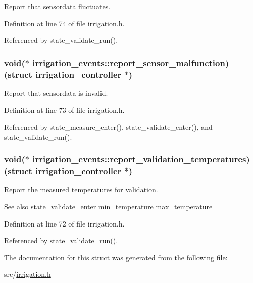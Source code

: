 Report that sensordata fluctuates. 



Definition at line 74 of file irrigation.\+h.



Referenced by state\+\_\+validate\+\_\+run().

\hypertarget{structirrigation__events_abafd6872889e6e54648653f690e61ec6}{}
\subsubsection[{report\+\_\+sensor\+\_\+malfunction}]{\setlength{\rightskip}{0pt plus 5cm}void($\ast$ irrigation\+\_\+events\+::report\+\_\+sensor\+\_\+malfunction) (struct {\bf irrigation\+\_\+controller} $\ast$)}\label{structirrigation__events_abafd6872889e6e54648653f690e61ec6}


Report that sensordata is invalid. 



Definition at line 73 of file irrigation.\+h.



Referenced by state\+\_\+measure\+\_\+enter(), state\+\_\+validate\+\_\+enter(), and state\+\_\+validate\+\_\+run().

\hypertarget{structirrigation__events_acc5d9d31cce6888cab54d32463470f07}{}
\subsubsection[{report\+\_\+validation\+\_\+temperatures}]{\setlength{\rightskip}{0pt plus 5cm}void($\ast$ irrigation\+\_\+events\+::report\+\_\+validation\+\_\+temperatures) (struct {\bf irrigation\+\_\+controller} $\ast$)}\label{structirrigation__events_acc5d9d31cce6888cab54d32463470f07}


Report the measured temperatures for validation. 

\begin{DoxySeeAlso}{See also}
\hyperlink{group__state__validate_gac0d41d4685bd461b3a613f6320405b79}{state\+\_\+validate\+\_\+enter} min\+\_\+temperature max\+\_\+temperature 
\end{DoxySeeAlso}


Definition at line 72 of file irrigation.\+h.



Referenced by state\+\_\+validate\+\_\+run().



The documentation for this struct was generated from the following file\+:\begin{DoxyCompactItemize}
\item 
src/\hyperlink{irrigation_8h}{irrigation.\+h}\end{DoxyCompactItemize}
